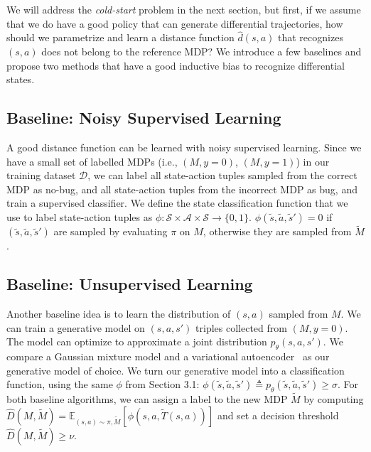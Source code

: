 \documentclass{article}
\newcommand{\train}{\mathcal{D}}
\def\gA{{\mathcal{A}}}
\def\gS{{\mathcal{S}}}
\newcommand{\E}{\mathbb{E}}
\begin{document}
We will address the \textit{cold-start} problem in the next section, but first, if we assume that we do have a good policy that can generate differential trajectories, how should we parametrize and learn a distance function $\hat d(s, a)$ that recognizes $(s, a)$ does not belong to the reference MDP? We introduce a few baselines and propose two methods that have a good inductive bias to recognize differential states. 




\subsection{Baseline: Noisy Supervised Learning}
\label{sec:naive_sup}
\vspace{-2mm} 

A good distance function can be learned with noisy supervised learning. Since we have a small set of labelled MDPs (i.e., $(M, y=0)$, $(M, y=1)$) in our training dataset $\train$, we can label all state-action tuples sampled from the correct MDP as no-bug, and all state-action tuples from the incorrect MDP as bug, and train a supervised classifier. We define the state classification function that we use to label state-action tuples as $\phi: \gS \times \gA \times \gS \rightarrow \{0, 1\}$. $\phi(\tilde s, \tilde a, \tilde s') = 0$ if $(\tilde s, \tilde a, \tilde s')$ are sampled by evaluating $\pi$ on $M$, otherwise they are sampled from $\tilde M$.




\subsection{Baseline: Unsupervised Learning}
\label{sec:naive_unsup}
\vspace{-2mm} 

Another baseline idea is to learn the distribution of $(s, a)$ sampled from $M$. 
We can train a generative model on $(s, a, s')$ triples collected from $(M, y=0)$. The model can optimize to approximate a joint distribution $p_\theta(s, a, s')$.
We compare a Gaussian mixture model and a variational autoencoder~\cite{kingma2013auto} as our generative model of choice. 
We turn our generative model into a classification function, using the same $\phi$ from Section 3.1:
$\phi(\tilde s, \tilde a, \tilde s') \triangleq p_{\theta}(\tilde s, \tilde a, \tilde s') \geq \sigma$. 
For both baseline algorithms, we can assign a label to the new MDP $\tilde M$ by computing $\hat D(M, \tilde M) = \E_{(s, a) \sim \pi, \tilde M} [\phi(s, a, \tilde T(s, a))]$ and set a decision threshold $\hat D(M, \tilde M) \geq \nu$.
\end{document}
